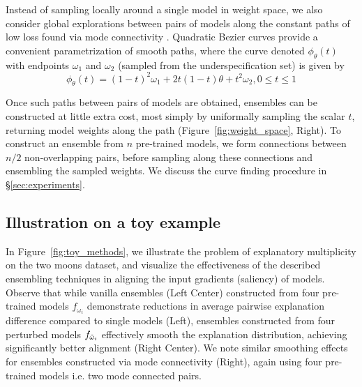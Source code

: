 Instead of sampling locally around a single model in weight space, we also consider global explorations between pairs of models along the constant paths of low loss found via mode connectivity \citep{garipov2018}. Quadratic Bezier curves provide a convenient parametrization of smooth paths, where the curve denoted $\phi_\theta(t)$ with endpoints $\omega_1$ and $\omega_2$ (sampled from the underspecification set) is given by 
\[\phi_\theta(t) = (1-t)^2 \omega_1 + 2t(1-t)\theta + t^2\omega_2, 0 \leq t \leq 1\]

Once such paths between pairs of models are obtained, ensembles can be constructed at little extra cost, most simply by uniformally sampling the scalar $t$, returning model weights along the path (Figure~\ref{fig:weight_space}, Right). To construct an ensemble from $n$ pre-trained models, we form connections between $n/2$ non-overlapping pairs, before sampling along these connections and ensembling the sampled weights. We discuss the curve finding procedure in \S\ref{sec:experiments}.


\subsection{Illustration on a toy example}
\label{subsec:ensembles_illustration}

In Figure~\ref{fig:toy_methods}, we illustrate the problem of explanatory multiplicity on the two moons dataset, and visualize the effectiveness of the described ensembling techniques in aligning the input gradients (saliency) of models. Observe that while vanilla ensembles (Left Center) constructed from four pre-trained models $f_{\omega_i}$ demonstrate reductions in average pairwise explanation difference compared to single models (Left), ensembles constructed from four perturbed models $f_{\Tilde{\omega}_i}$ effectively smooth the explanation distribution, achieving significantly better alignment (Right Center). We note similar smoothing effects for ensembles constructed via mode connectivity (Right), again using four pre-trained models i.e. two mode connected pairs.

